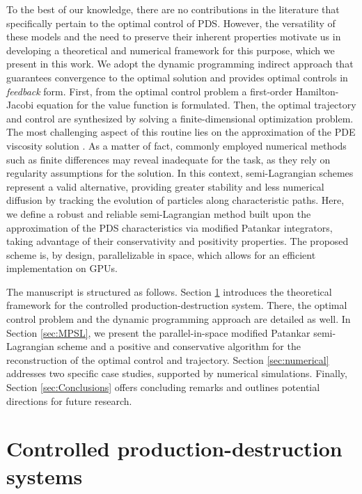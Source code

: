 \documentclass[10pt]{article}
\theoremstyle{remark}
\theoremstyle{definition}
\theoremstyle{remark}
\begin{document}
To the best of our knowledge, there are no contributions in the literature that specifically pertain to the optimal control of PDS. However, the versatility of these models and the need to preserve their inherent properties motivate us in developing a theoretical and numerical framework for this purpose, which we present in this work.
We adopt the dynamic programming \cite{Bellman1957} indirect approach that guarantees convergence to the optimal solution and provides optimal controls in \textit{feedback} form. First, from the optimal control problem a first-order Hamilton-Jacobi equation for the value function is formulated. Then, the optimal trajectory and control are synthesized by solving a finite-dimensional optimization problem. The most challenging aspect of this routine lies on the approximation of the PDE viscosity solution \cite{CrandallLions1983,CrandallEvansLions1984}. As a matter of fact, commonly employed numerical methods such as finite differences may reveal inadequate for the task, as they rely on regularity assumptions for the solution. In this context, semi-Lagrangian schemes represent a valid alternative, providing greater stability and less numerical diffusion by tracking the evolution of particles along characteristic paths. Here, we define a robust and reliable semi-Lagrangian method built upon the approximation of the PDS characteristics via modified Patankar integrators, taking advantage of their conservativity and positivity properties. The proposed scheme is, by design, parallelizable in space, which allows for an efficient implementation on GPUs.

The manuscript is structured as follows. Section \ref{sec:CPS} introduces the theoretical framework for the controlled production-destruction system. There, the optimal control problem and the dynamic programming approach are detailed as well. In Section \ref{sec:MPSL}, we present the parallel-in-space modified Patankar semi-Lagrangian scheme and a positive and conservative algorithm for the reconstruction of the optimal control and trajectory. Section \ref{sec:numerical} addresses two specific case studies, supported by numerical simulations. Finally, Section \ref{sec:Conclusions} offers concluding remarks and outlines potential directions for future research.

\section{Controlled production-destruction systems}\label{sec:CPS} %
\end{document}

